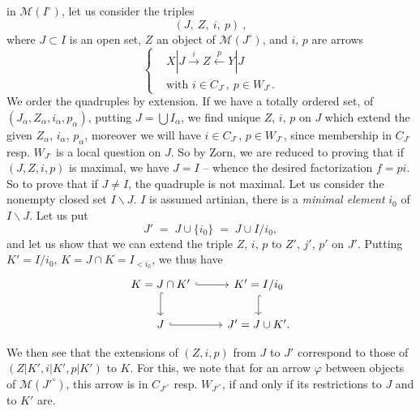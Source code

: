 
in $\mathcal{M}(I^\circ)$, let us consider the triples
\[
(J,\ Z,\ i,\ p)\ ,
\]
where $J\subset I$ is an open set, $Z$ an object of $\mathcal{M}(J^\circ)$, and $i$, $p$ are arrows
\[
\left\{
\begin{aligned}
& X|J \xrightarrow{\ i\ } Z \xleftarrow{\ p\ } Y|J \\
& \text{with } i\in C_{J^\circ},\ p\in W_{J^\circ}.
\end{aligned}
\right.
\]
We order the quadruples by extension. If we have a totally ordered set, of $(J_\alpha,Z_\alpha,i_\alpha,p_\alpha)$, putting $J=\bigcup I_\alpha$, we find unique $Z$, $i$, $p$ on $J$ which extend %
the given $Z_\alpha$, $i_\alpha$, $p_\alpha$, moreover we will have $i\in C_{J^\circ}$, $p\in W_{J^\circ}$, since membership in $C_{J^\circ}$ resp. $W_{J^\circ}$ is a local question on $J$. So by Zorn, we are reduced to proving that if $(J,Z,i,p)$ is maximal, we have $J=I$ – whence the desired factorization $f=pi$. So to prove that if %
$J\neq I$, the quadruple is not maximal. Let us consider the nonempty closed set $I\backslash J$. $I$ is assumed artinian, there is a \textit{minimal element} $i_0$ of $I\backslash J$. Let us put
\[
J' \;=\; J\cup\{i_0\} \;=\; J\cup I/i_0,
\]
and let us show that we can extend the triple $Z$, $i$, $p$ to $Z'$, $j'$, $p'$ on $J'$. Putting $K'=I/i_0$, %
$K=J\cap K=I_{<i_0}$, we thus have %
\[
\begin{tikzcd}
K=J\cap K' \arrow[r, hook] \arrow[d, hook] & K'=I/i_0 \arrow[d, hook] \\
J \arrow[r, hook] & J'=J\cup K'.
\end{tikzcd}
\]

We then see that the extensions of $(Z,i,p)$ from $J$ to $J'$ correspond to those of $(Z|K',i|K',p|K')$ to $K$. For this, we note that for an arrow $\varphi$ between objects of $\mathcal{M}(J'^\circ)$, this arrow is in $C_{J'^\circ}$ resp. $W_{J'^\circ}$, if and only if its restrictions to $J$ and to $K'$ are.

